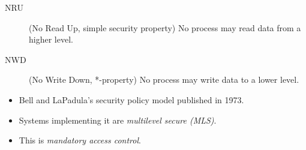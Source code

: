 \begin{frame}{\insertsubsectionhead}
  \begin{definition}
    \begin{description}
      \item[NRU] (No Read Up, simple security property)
        No process may read data from a higher level.
      \item[NWD] (No Write Down, *-property)
        No process may write data to a lower level.
    \end{description}
  \end{definition}
\end{frame}

\begin{frame}
  \begin{remark}
    \begin{itemize}
      \item Bell and LaPadula's security policy model published in 1973.
      \item Systems implementing it are \emph{multilevel secure (MLS)}.
      \item This is \emph{mandatory access control}.
    \end{itemize}
  \end{remark}
\end{frame}


